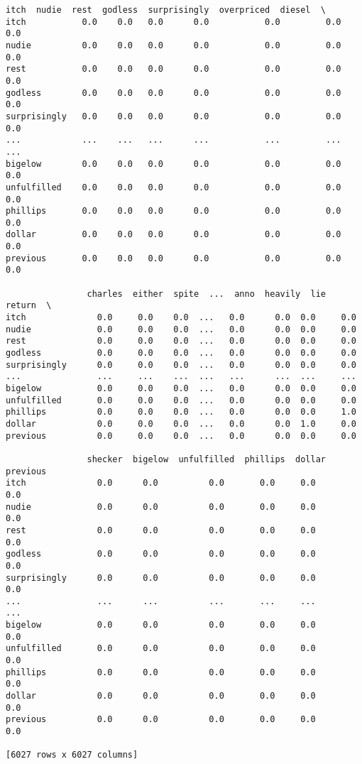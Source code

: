\documentclass[12pt, letterpaper]{article}
\begin{document}
\begin{lstlisting}
itch  nudie  rest  godless  surprisingly  overpriced  diesel  \
itch           0.0    0.0   0.0      0.0           0.0         0.0     0.0   
nudie          0.0    0.0   0.0      0.0           0.0         0.0     0.0   
rest           0.0    0.0   0.0      0.0           0.0         0.0     0.0   
godless        0.0    0.0   0.0      0.0           0.0         0.0     0.0   
surprisingly   0.0    0.0   0.0      0.0           0.0         0.0     0.0   
...            ...    ...   ...      ...           ...         ...     ...   
bigelow        0.0    0.0   0.0      0.0           0.0         0.0     0.0   
unfulfilled    0.0    0.0   0.0      0.0           0.0         0.0     0.0   
phillips       0.0    0.0   0.0      0.0           0.0         0.0     0.0   
dollar         0.0    0.0   0.0      0.0           0.0         0.0     0.0   
previous       0.0    0.0   0.0      0.0           0.0         0.0     0.0   

                charles  either  spite  ...  anno  heavily  lie  return  \
itch              0.0     0.0    0.0  ...   0.0      0.0  0.0     0.0   
nudie             0.0     0.0    0.0  ...   0.0      0.0  0.0     0.0   
rest              0.0     0.0    0.0  ...   0.0      0.0  0.0     0.0   
godless           0.0     0.0    0.0  ...   0.0      0.0  0.0     0.0   
surprisingly      0.0     0.0    0.0  ...   0.0      0.0  0.0     0.0   
...               ...     ...    ...  ...   ...      ...  ...     ...   
bigelow           0.0     0.0    0.0  ...   0.0      0.0  0.0     0.0   
unfulfilled       0.0     0.0    0.0  ...   0.0      0.0  0.0     0.0   
phillips          0.0     0.0    0.0  ...   0.0      0.0  0.0     1.0   
dollar            0.0     0.0    0.0  ...   0.0      0.0  1.0     0.0   
previous          0.0     0.0    0.0  ...   0.0      0.0  0.0     0.0   

                shecker  bigelow  unfulfilled  phillips  dollar  previous  
itch              0.0      0.0          0.0       0.0     0.0       0.0  
nudie             0.0      0.0          0.0       0.0     0.0       0.0  
rest              0.0      0.0          0.0       0.0     0.0       0.0  
godless           0.0      0.0          0.0       0.0     0.0       0.0  
surprisingly      0.0      0.0          0.0       0.0     0.0       0.0  
...               ...      ...          ...       ...     ...       ...  
bigelow           0.0      0.0          0.0       0.0     0.0       0.0  
unfulfilled       0.0      0.0          0.0       0.0     0.0       0.0  
phillips          0.0      0.0          0.0       0.0     0.0       0.0  
dollar            0.0      0.0          0.0       0.0     0.0       0.0  
previous          0.0      0.0          0.0       0.0     0.0       0.0 

[6027 rows x 6027 columns]
\end{lstlisting}
\end{document}
